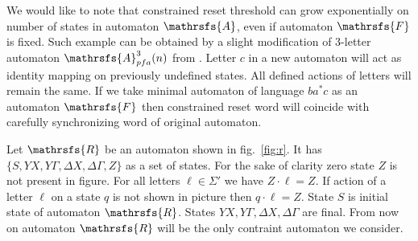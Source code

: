 \documentclass[11pt]{llncs}
\newcommand{\A}{\mathrsfs{A}}
\newcommand{\R}{\mathrsfs{R}}
\newcommand{\G}{\Gamma}
\newcommand{\D}{\Delta}
\newcommand{\rtc}{\mathrm{rt}_{c}}
\begin{document}
We would like to note that constrained reset threshold can grow exponentially on number of states in automaton $\A$, even
if automaton $\mathrsfs{F}$ is fixed. Such example can be obtained by a slight modification of 3-letter automaton $\mathrsfs{A}^3_{pfa}(n)$
from \cite{Mart}. Letter $c$ in a new automaton will act as identity mapping on previously undefined states. All defined actions
of letters will remain the same. %
If we take minimal automaton of language $ba^*c$ as an automaton $\mathrsfs{F}$ then constrained reset word will coincide 
with carefully synchronizing word of original automaton.


Let $\R$ be an automaton shown in fig.~\ref{fig:r}. It has $\{S, YX, Y\G , \D X, \D \G, Z\}$ as a set of states.
For the sake of clarity zero state $Z$ is not present in figure. For all letters $\ell \in \Sigma'$ we have 
$Z \cdot \ell = Z$. If action of a letter $\ell$ on a state $q$ is not shown in picture then $q \cdot \ell = Z$.
State $S$ is initial state of automaton $\R$. States $YX, Y\G , \D X, \D \G$ are final. From now on automaton $\R$
will be the only contraint automaton we consider.
\end{document}
